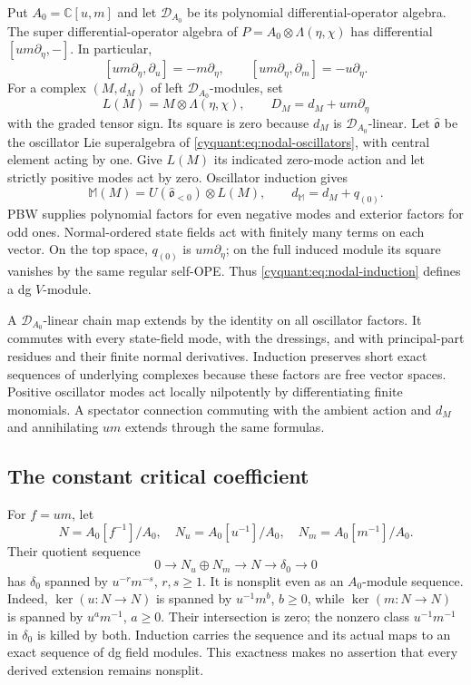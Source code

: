 Put $A_0=\mathbb C[u,m]$ and let $\mathcal D_{A_0}$ be its polynomial
differential-operator algebra.  The super differential-operator algebra
of $P=A_0\otimes\Lambda(\eta,\chi)$ has differential
$[um\partial_\eta,-]$.  In particular,
\[
 [um\partial_\eta,\partial_u]=-m\partial_\eta,
 \qquad [um\partial_\eta,\partial_m]=-u\partial_\eta.
\]
For a complex $(M,d_M)$ of left $\mathcal D_{A_0}$-modules, set
\[
 L(M)=M\otimes\Lambda(\eta,\chi),\qquad
 D_M=d_M+um\partial_\eta
\]
with the graded tensor sign.  Its square is zero because $d_M$ is
$\mathcal D_{A_0}$-linear.
Let $\widehat{\mathfrak o}$ be the oscillator Lie superalgebra of
\eqref{cyquant:eq:nodal-oscillators}, with central element acting by
one.  Give $L(M)$ its indicated zero-mode action and let strictly
positive modes act by zero.  Oscillator induction gives
\begin{equation}\label{cyquant:eq:nodal-induction}
 \mathbb M(M)=U(\widehat{\mathfrak o}_{<0})\otimes L(M),
 \qquad d_{\mathbb M}=d_M+q_{(0)}.
\end{equation}
PBW supplies polynomial factors for even negative modes and exterior
factors for odd ones.  Normal-ordered state fields act with finitely
many terms on each vector.  On the top space, $q_{(0)}$ is
$um\partial_\eta$; on the full induced module its square vanishes by
the same regular self-OPE.  Thus \eqref{cyquant:eq:nodal-induction}
defines a dg $V$-module.

A $\mathcal D_{A_0}$-linear chain map extends by the identity on all
oscillator factors.  It commutes with every state-field mode, with the
dressings, and with principal-part residues and their finite normal
derivatives.  Induction preserves short exact sequences of underlying
complexes because these factors are free vector spaces.  Positive
oscillator modes act locally nilpotently by differentiating finite
monomials.  A spectator connection commuting with the ambient action
and $d_M$ and annihilating $um$ extends through the same formulas.

\subsection{The constant critical coefficient}

For $f=um$, let
\[
 N=A_0[f^{-1}]/A_0,\quad N_u=A_0[u^{-1}]/A_0,\quad
 N_m=A_0[m^{-1}]/A_0.
\]
Their quotient sequence
\[
 0\longrightarrow N_u\oplus N_m\longrightarrow N
              \longrightarrow\delta_0\longrightarrow0
\]
has $\delta_0$ spanned by $u^{-r}m^{-s}$, $r,s\geq1$.
It is nonsplit even as an $A_0$-module sequence.  Indeed,
$\ker(u:N\to N)$ is spanned by $u^{-1}m^b$, $b\geq0$, while
$\ker(m:N\to N)$ is spanned by $u^am^{-1}$, $a\geq0$.
Their intersection is zero; the nonzero class $u^{-1}m^{-1}$ in
$\delta_0$ is killed by both.  Induction carries the sequence and
its actual maps to an exact sequence of dg field modules.  This
exactness makes no assertion that every derived extension remains
nonsplit.

